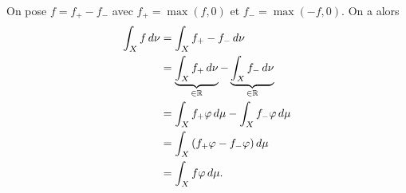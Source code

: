 {\begin{nntd-sol}[]
\begin{enumerate}
\begin{enumerate}
                On pose \(f=f_+-f_-\) avec \(f_+=\max\left(f,0\right)\) et \(f_-=\max\left(-f,0\right)\).
                On a alors
                \begin{equation*}
                    \begin{aligned}
                        \int_X f\der\nu
                        &= \int_X f_+ - f_-\der\nu \\
                        &= \underbrace{\int_X f_+\der\nu}_{\in\R} - \underbrace{\int_X f_-\der\nu}_{\in\R} \\
                        &= \int_X f_+\varphi\der\mu - \int_X f_-\varphi\der\mu \\
                        &= \int_X \left(f_+\varphi - f_-\varphi\right)\der\mu \\
                        &= \int_X f\varphi\der\mu.
                    \end{aligned}
                \end{equation*}
            \end{enumerate}
        \end{enumerate}
    \end{nntd-sol}
}{}

